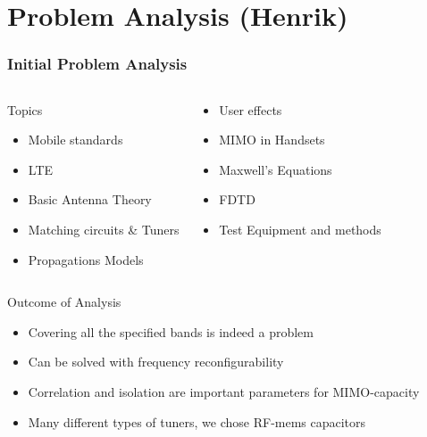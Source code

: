\section[Problem Analysis]{Problem Analysis (Henrik)}
\begin{frame}[fragile]
    \frametitle{Initial Problem Analysis}
    \vspace*{-0.5cm}
    \begin{columns}[onlytextwidth,t]
    \begin{block}{Topics}
          \begin{itemize}
          \item Mobile standards
          \item LTE
          \item Basic Antenna Theory
          \item Matching circuits \& Tuners
          \item Propagations Models
          \end{itemize}
    \end{block}
    \begin{block}{}
          \begin{itemize}
          \item User effects
          \item MIMO in Handsets
          \item Maxwell's Equations
          \item FDTD 
          \item Test Equipment and methods
          \end{itemize}
    \end{block}
    \end{columns}
    \begin{block}{Outcome of Analysis}
      \begin{itemize}
      \item Covering all the specified bands is indeed a problem
      \item Can be solved with frequency reconfigurability
      \item Correlation and isolation are important parameters for MIMO-capacity
      \item Many different types of tuners, we chose RF-mems capacitors
      \end{itemize}
    \end{block}
\end{frame}

